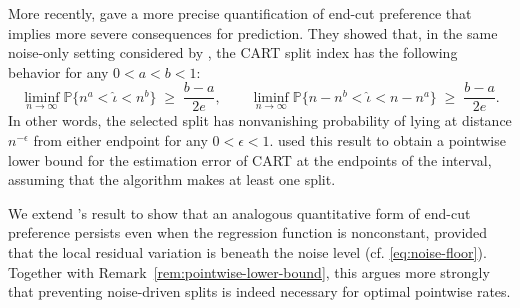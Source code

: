 \documentclass[11pt]{article}
\theoremstyle{plain}
\theoremstyle{definition}
\theoremstyle{remark}
\theoremstyle{plain}
\renewcommand{\P}{\mathbb{P}}
\newcommand{\1}{\mathbbm{1}}
\begin{document}
More recently, \citet[Theorem~SA-1]{cattaneo2025honest} gave a more precise quantification of end-cut preference that implies more severe consequences for prediction.
They showed that, in the same noise-only setting considered by \citet{breiman1984classification}, the CART split index has the following behavior for any $0 < a < b < 1$:
\begin{equation}\label{eq:cattaneo}
  \liminf_{n\to\infty}\P\bigl\{n^a<\hat\iota<n^b\bigr\}
  \;\ge\;
  \frac{b-a}{2e},
  \qquad
  \liminf_{n\to\infty}\P\bigl\{n-n^b<\hat\iota<n-n^a\bigr\}
  \;\ge\;
  \frac{b-a}{2e}.
\end{equation}
In other words, the selected split has nonvanishing
probability of lying at distance $n^{-\epsilon}$ from either endpoint for any $0 < \epsilon < 1$.
\citet{cattaneo2025honest} used this result to obtain a pointwise lower bound for the estimation error of CART at the endpoints of the interval, assuming that the algorithm makes at least one split.


We extend \citet{cattaneo2025honest}'s result to show that an analogous quantitative form of end-cut preference persists even when the regression function is nonconstant, provided that the local residual variation is beneath the noise level (cf. \eqref{eq:noise-floor}).
Together with Remark~\ref{rem:pointwise-lower-bound}, this argues more strongly that preventing noise-driven splits is indeed necessary for optimal pointwise rates.
\end{document}
